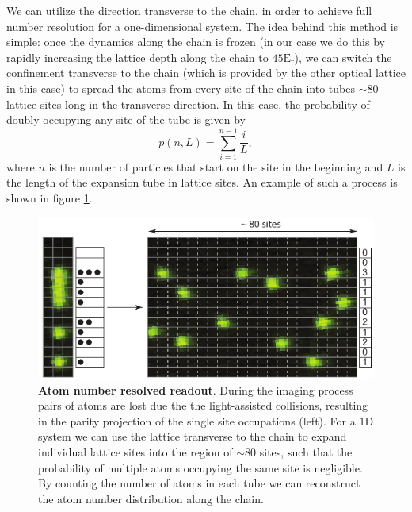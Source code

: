 We can utilize the direction transverse to the chain, in order to achieve full number resolution for a one-dimensional system. The idea behind this method is simple: once the dynamics along the chain is frozen (in our case we do this by rapidly increasing the lattice depth along the chain to $45 \mathrm{E_{r}}$), we can switch the confinement transverse to the chain (which is provided by the other optical lattice in this case) to spread the atoms from every site of the chain into tubes $\sim 80$ lattice sites long in the transverse direction. In this case, the probability of doubly occupying any site of the tube is given by
\begin{equation}
p(n,L) = \sum_{i=1}^{n-1}\frac{i}{L},
\end{equation}
where $n$ is the number of particles that start on the site in the beginning and $L$ is the length of the expansion tube in lattice sites. An example of such a process is shown in figure \ref{fig:CTE_fullcounting}.

\begin{figure}[t]
	\centering
	\includegraphics[scale=1]{figures/CTE_fullcounting.pdf}
	\caption{{\bf Atom number resolved readout}. During the imaging process pairs of atoms are lost due the the light-assisted collisions, resulting in the parity projection of the single site occupations (left). For a $1\mathrm{D}$ system we can use the lattice transverse to the chain to expand individual lattice sites into the region of $\sim 80$ sites, such that the probability of multiple atoms occupying the same site is negligible. By counting the number of atoms in each tube we can reconstruct the atom number distribution along the chain.}
	\label{fig:CTE_fullcounting}
\end{figure}

